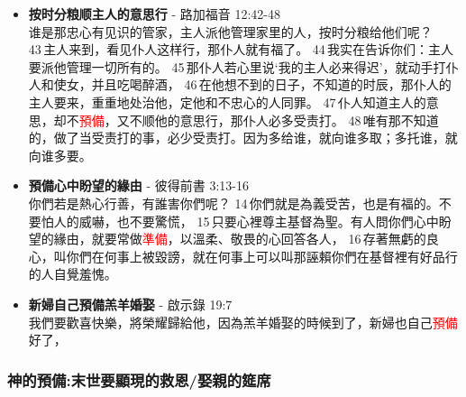 \begin{itemize}
\item \textbf{按时分粮顺主人的意思行} - 路加福音 12:42-48\\
谁是那忠心有见识的管家，主人派他管理家里的人，按时分粮给他们呢？ 43 主人来到，看见仆人这样行，那仆人就有福了。 44 我实在告诉你们：主人要派他管理一切所有的。 45 那仆人若心里说‘我的主人必来得迟’，就动手打仆人和使女，并且吃喝醉酒， 46 在他想不到的日子，不知道的时辰，那仆人的主人要来，重重地处治他，定他和不忠心的人同罪。 47 仆人知道主人的意思，却不\textcolor{red}{預備}，又不顺他的意思行，那仆人必多受责打。 48 唯有那不知道的，做了当受责打的事，必少受责打。因为多给谁，就向谁多取；多托谁，就向谁多要。

\item \textbf{預備心中盼望的緣由} - 彼得前書 3:13-16\\
你們若是熱心行善，有誰害你們呢？ 14 你們就是為義受苦，也是有福的。不要怕人的威嚇，也不要驚慌， 15 只要心裡尊主基督為聖。有人問你們心中盼望的緣由，就要常做\textcolor{red}{準備}，以溫柔、敬畏的心回答各人， 16 存著無虧的良心，叫你們在何事上被毀謗，就在何事上可以叫那誣賴你們在基督裡有好品行的人自覺羞愧。

\item \textbf{新婦自己預備羔羊婚娶} - 啟示錄 19:7\\
我們要歡喜快樂，將榮耀歸給他，因為羔羊婚娶的時候到了，新婦也自己\textcolor{red}{預備}好了，
\end{itemize}

\subsubsection{神的預備:末世要顯現的救恩/娶親的筵席}

